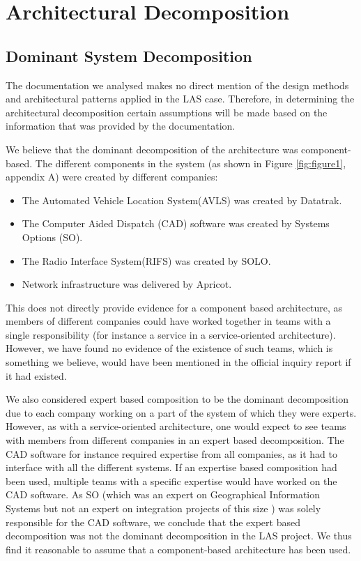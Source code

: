 \section*{Architectural Decomposition}

\subsection*{Dominant System Decomposition}

The documentation we analysed makes no direct mention of the design methods and architectural patterns applied in the LAS case.
Therefore, in determining the architectural decomposition certain assumptions will be made based on the information that was provided by the documentation.

We believe that the dominant decomposition of the architecture was component-based.
The different components in the system (as shown in Figure \ref{fig:figure1}, appendix A) were created by different companies:
\begin{itemize}[noitemsep]
\item The Automated Vehicle Location System(AVLS) was created by Datatrak.
\item The Computer Aided Dispatch (CAD) software was created by Systems Options (SO).
\item The Radio Interface System(RIFS) was created by SOLO.
\item Network infrastructure was delivered by Apricot.
\end{itemize}

This does not directly provide evidence for a component based architecture, as members of different companies could have worked together in teams with a single responsibility
(for instance a service in a service-oriented architecture).
However, we have found no evidence of the existence of such teams, which is something we believe, would have been mentioned in the official inquiry report \autocite{officialreport} if it had existed.

We also considered expert based composition to be the dominant decomposition due to each company working on a part of the system of which they were experts.
However, as with a service-oriented architecture, one would expect to see teams with members from different companies in an expert based decomposition.
The CAD software for instance required expertise from all companies, as it had to interface with all the different systems.
If an expertise based composition had been used, multiple teams with a specific expertise would have worked on the CAD software.
As SO (which was an expert on Geographical Information Systems \autocite{techsum} but not an expert on integration projects of this size \autocite[3078]{officialreport}) was solely responsible for the CAD software,
we conclude that the expert based decomposition was not the dominant decomposition in the LAS project.
We thus find it reasonable to assume that a component-based architecture has been used.

